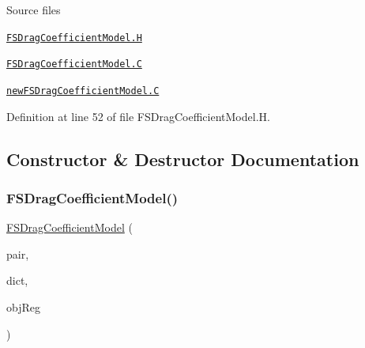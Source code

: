 \begin{DoxyParagraph}{Source files}

\begin{DoxyItemize}
\item \href{../../../home/carlo/data/GeN-Foam/GeN-Foam_ffn/GeN-Foam/GeN-Foam/classes/thermalHydraulics/src/physicsModels/dragModels/FSDragCoefficientModels/FSDragCoefficientModel.H}{\tt F\+S\+Drag\+Coefficient\+Model.\+H} 
\item \href{../../../home/carlo/data/GeN-Foam/GeN-Foam_ffn/GeN-Foam/GeN-Foam/classes/thermalHydraulics/src/physicsModels/dragModels/FSDragCoefficientModels/FSDragCoefficientModel.C}{\tt F\+S\+Drag\+Coefficient\+Model.\+C} 
\item \href{../../../home/carlo/data/GeN-Foam/GeN-Foam_ffn/GeN-Foam/GeN-Foam/classes/thermalHydraulics/src/physicsModels/dragModels/FSDragCoefficientModels/newFSDragCoefficientModel.C}{\tt new\+F\+S\+Drag\+Coefficient\+Model.\+C} 
\end{DoxyItemize}
\end{DoxyParagraph}


Definition at line 52 of file F\+S\+Drag\+Coefficient\+Model.\+H.



\subsection{Constructor \& Destructor Documentation}
\mbox{\label{classFoam_1_1FSDragCoefficientModel_af5c49df15f5911779b0a184312d9a0df}} 
\subsubsection{\texorpdfstring{F\+S\+Drag\+Coefficient\+Model()}{FSDragCoefficientModel()}}
{\footnotesize\ttfamily \hyperlink{classFoam_1_1FSDragCoefficientModel}{F\+S\+Drag\+Coefficient\+Model} (\begin{DoxyParamCaption}\item[{const \hyperlink{classFoam_1_1FSPair}{F\+S\+Pair} \&}]{pair,  }\item[{const dictionary \&}]{dict,  }\item[{const object\+Registry \&}]{obj\+Reg }\end{DoxyParamCaption})}



